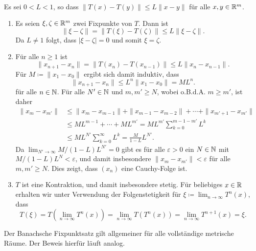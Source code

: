 \documentclass[a4paper,10pt]{article}
\begin{document}
\begin{solution}
 Es sei $0 < L < 1$, so dass $\|T(x)-T(y)\| \leq L\|x-y\|$ für alle $x,y \in \mathbb{R}^m$.
 \begin{enumerate}
  \item
   Es seien $\xi, \zeta \in \mathbb{R}^m$ zwei Fixpunkte von $T$. Dann ist
   \[
    \|\xi-\zeta\| = \|T(\xi)-T(\zeta)\| \leq L\|\xi-\zeta\|.
   \]
   Da $L \neq 1$ folgt, dass $|\xi-\zeta| = 0$ und somit $\xi = \zeta$.
  \item
   Für alle $n \geq 1$ ist
   \[
    \|x_{n+1} - x_n\|
    = \|T(x_n) - T(x_{n-1})\|
    \leq L\|x_n - x_{n-1}\|.
   \]
   Für $M \coloneqq \|x_1 - x_0\|$ ergibt sich damit induktiv, dass
   \[
    \|x_{n+1} - x_n\| \leq L^n \|x_1 - x_0\| = M L^n.
   \]
   für alle $n \in \mathbb{N}$. Für alle $N' \in \mathbb{N}$ und $m, m' \geq N$, wobei o.B.d.A. $m \geq m'$, ist daher
   \begin{align*}
    \|x_m - x_{m'}\|
    &\leq \|x_m - x_{m-1}\| + \|x_{m-1} - x_{m-2}\| + \dotsb + \|x_{m'+1} - x_{m'}\| \\
    &\leq M L^{m-1} + \dotsb + M L^{m'}
    = M L^{m'} \sum_{k=0}^{m-1-m'} L^k \\
    &\leq M L^{N'} \sum_{k=0}^\infty L^k
    = \frac{M}{1-L} L^{N'}.
   \end{align*}
   Da $\lim_{N' \to \infty} M/(1-L) L^{N'} = 0$ gibt es für alle $\varepsilon > 0$ ein $N \in \mathbb{N}$ mit $M/(1-L) L^N < \varepsilon$, und damit insbesondere $\|x_m - x_{m'}\| < \varepsilon$ für alle $m, m' \geq N$. Dies zeigt, dass $(x_n)$ eine Cauchy-Folge ist.
  \item
   $T$ ist eine Kontraktion, und damit insbesondere stetig. Für beliebiges $x \in \mathbb{R}$ erhalten wir unter Verwendung der Folgenstetigkeit für $\xi \coloneqq \lim_{n \to \infty} T^n(x)$, dass
   \[
    T(\xi)
    = T\left(\lim_{n \to \infty} T^n(x)\right)
    = \lim_{n \to \infty} T(T^n(x))
    = \lim_{n \to \infty} T^{n+1}(x)
    = \xi.
   \]
 \end{enumerate}
\end{solution}


\begin{bem}
 Der Banachsche Fixpunktsatz gilt allgemeiner für alle vollständige metrische Räume. Der Beweis hierfür läuft analog.
\end{bem}


\newpage


\printsolutions
\end{document}
